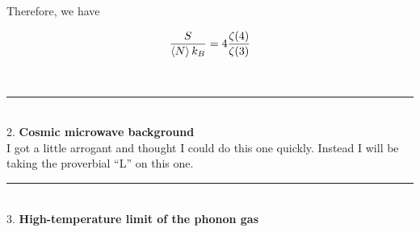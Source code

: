 \documentclass[]{article}
\begin{document}
\begin{enumerate}[(i)]
Therefore, we have

\begin{equation}
\begin{split}
\frac{S}{\expval{N}k_B} & =4 \frac{  \zeta(4)  }{  \zeta(3)   } \\
\end{split}
\end{equation}



\end{enumerate}


\hfill \\
\noindent\rule{15cm}{0.4pt} \\

2. {\bf      Cosmic microwave background         } \\ 

I got a little arrogant and thought I could do this one quickly. Instead I will be taking the proverbial ``L'' on this one. \\


\noindent\rule{15cm}{0.4pt} \\



3. {\bf High-temperature limit of the phonon gas} \\
\end{document}
